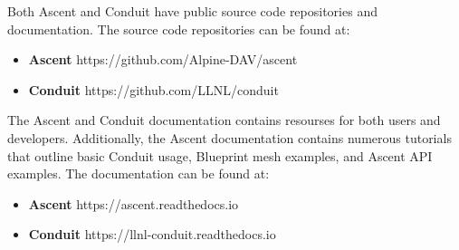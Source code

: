 Both Ascent and Conduit have public source code repositories and
documentation.
%
The source code repositories can be found at:
\begin{itemize}
  \item \textbf{Ascent} https://github.com/Alpine-DAV/ascent
  \item \textbf{Conduit} https://github.com/LLNL/conduit
\end{itemize}

The Ascent and Conduit documentation contains resourses for both users and
developers.
%
Additionally, the Ascent documentation contains numerous tutorials that
outline basic Conduit usage, Blueprint mesh examples, and Ascent API examples.
The documentation can be found at:
\begin{itemize}
  \item \textbf{Ascent} https://ascent.readthedocs.io
  \item \textbf{Conduit} https://llnl-conduit.readthedocs.io
\end{itemize}
